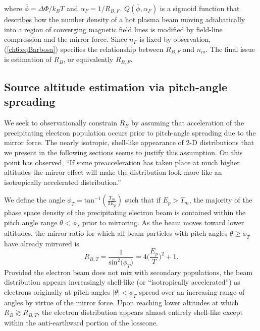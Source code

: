   where $\bar{\phi} = \Delta \Phi / k_B T $ and $\alpha_F = 1 / R_{B,F}$.
  $Q (\bar{\phi}, \alpha_F)$ is a sigmoid function \citep[Figure
  1b][]{Barbosa1977} that describes how the number density of a hot plasma beam
  moving adiabatically into a region of converging magnetic field lines is
  modified by field-line compression and the mirror force. Since $n_F$ is fixed
  by observation, (\ref{ch6:eqBarbosa}) specifies the relationship between
  $R_{B,F}$ and $n_m$. The final issue is estimation of $R_B$, or equivalently
  $R_{B,F}$.

  \subsection{Source altitude estimation via pitch-angle spreading} \label{ssSourceAlt}

  We seek to observationally constrain $R_B$ by assuming that acceleration of
  the precipitating electron population occurs prior to pitch-angle spreading
  due to the mirror force. The nearly isotropic, shell-like appearance of 2-D
  distributions that we present in the following sections seems to justify this
  assumption. On this point \citet{Bostrom2003a} has observed, ``If some
  preacceleration has taken place at much higher altitudes the mirror effect
  will make the distribution look more like an isotropically accelerated
  distribution.''

  We define the angle $\phi_T = \textrm{tan}^{-1} ( \frac{T_m}{2 E_p} )$ such
  that if $E_p > T_m$, the majority of the phase space density of the
  precipitating electron beam is contained within the pitch angle range
  $ \theta < \phi_T$ prior to mirroring. As the beam moves toward lower
  altitudes, the mirror ratio for which all beam particles with pitch angles
  $\theta \geq \phi_T$ have already mirrored is
  \begin{equation} \label{ch6:RBTherm} R_{B,T} = \dfrac{1}{\mathrm{sin}^2 \big
      (\phi_T \big ) } = 4 \Big ( \dfrac{E_p}{T} \Big )^2 + 1.
  \end{equation}
  Provided the electron beam does not mix with secondary populations, the beam
  distribution appears increasingly shell-like (or ``isotropically
  accelerated'') as electrons originally at pitch angles $\vert \theta \vert <
  \phi_T$ spread over an increasing range of angles by virtue of the mirror
  force. Upon reaching lower altitudes at which $R_B \gtrsim R_{B,T}$, the
  electron distribution appears almost entirely shell-like except within the
  anti-earthward portion of the losscone.

